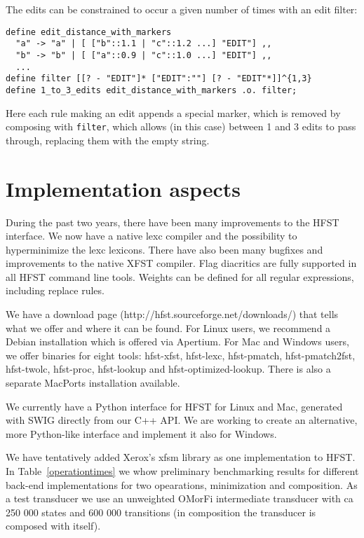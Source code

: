 \documentclass{llncs}
\begin{document}
The edits can be constrained to occur a given number of times with an edit
filter:

\begin{framed}
\begin{verbatim}
define edit_distance_with_markers
  "a" -> "a" | [ ["b"::1.1 | "c"::1.2 ...] "EDIT"] ,,
  "b" -> "b" | [ ["a"::0.9 | "c"::1.0 ...] "EDIT"] ,,
  ...
define filter [[? - "EDIT"]* ["EDIT":""] [? - "EDIT"*]]^{1,3}
define 1_to_3_edits edit_distance_with_markers .o. filter;
\end{verbatim}
\end{framed}

Here each rule making an edit appends a special marker, which is removed
by composing with \verb+filter+, which allows (in this case) between 1 and 3
edits to pass through, replacing them with the empty string.

\section{Implementation aspects}\label{sec:background}
During the past two years, there have been many improvements to the HFST 
interface. We now have a native lexc compiler and the possibility to 
hyperminimize the lexc lexicons. There have also been many bugfixes and 
improvements to the native XFST compiler. Flag diacritics are fully supported 
in all HFST command line tools. Weights can be defined for all regular expressions,
including replace rules.

We have a download page (http://hfst.sourceforge.net/downloads/) that tells what 
we offer and where it can be found. For Linux users, we recommend a Debian installation
which is offered via Apertium. For Mac and Windows users,
we offer binaries for eight tools: hfst-xfst, hfst-lexc, hfst-pmatch,
hfst-pmatch2fst, hfst-twolc, hfst-proc, hfst-lookup and hfst-optimized-lookup.
There is also a separate MacPorts installation available.

We currently have a Python interface for HFST for Linux and Mac, generated with SWIG directly
from our C++ API. We are working to create an alternative, more Python-like interface
and implement it also for Windows.

We have tentatively added Xerox's xfsm library as one implementation to HFST.
In Table~\ref{operationtimes} we whow preliminary benchmarking results for different back-end
implementations for two opearations, minimization and composition. As a test transducer we use an 
unweighted OMorFi intermediate transducer with ca 250 000 states and 600 000 transitions (in composition
the transducer is composed with itself).
\end{document}

